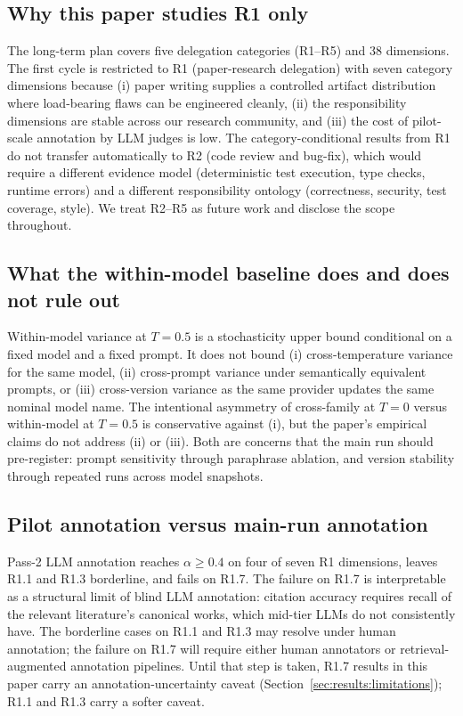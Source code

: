 \subsection{Why this paper studies R1 only}
\label{sec:discussion:r1_only}

The long-term plan covers five delegation categories (R1--R5) and 38 dimensions. The first cycle is restricted to R1 (paper-research delegation) with seven category dimensions because (i) paper writing supplies a controlled artifact distribution where load-bearing flaws can be engineered cleanly, (ii) the responsibility dimensions are stable across our research community, and (iii) the cost of pilot-scale annotation by LLM judges is low. The category-conditional results from R1 do not transfer automatically to R2 (code review and bug-fix), which would require a different evidence model (deterministic test execution, type checks, runtime errors) and a different responsibility ontology (correctness, security, test coverage, style). We treat R2--R5 as future work and disclose the scope throughout.

\subsection{What the within-model baseline does and does not rule out}
\label{sec:discussion:within_model}

Within-model variance at $T = 0.5$ is a stochasticity upper bound conditional on a fixed model and a fixed prompt. It does not bound (i) cross-temperature variance for the same model, (ii) cross-prompt variance under semantically equivalent prompts, or (iii) cross-version variance as the same provider updates the same nominal model name. The intentional asymmetry of cross-family at $T = 0$ versus within-model at $T = 0.5$ is conservative against (i), but the paper's empirical claims do not address (ii) or (iii). Both are concerns that the main run should pre-register: prompt sensitivity through paraphrase ablation, and version stability through repeated runs across model snapshots.

\subsection{Pilot annotation versus main-run annotation}
\label{sec:discussion:annotation}

Pass-2 LLM annotation reaches $\alpha \geq 0.4$ on four of seven R1 dimensions, leaves R1.1 and R1.3 borderline, and fails on R1.7. The failure on R1.7 is interpretable as a structural limit of blind LLM annotation: citation accuracy requires recall of the relevant literature's canonical works, which mid-tier LLMs do not consistently have. The borderline cases on R1.1 and R1.3 may resolve under human annotation; the failure on R1.7 will require either human annotators or retrieval-augmented annotation pipelines. Until that step is taken, R1.7 results in this paper carry an annotation-uncertainty caveat (Section~\ref{sec:results:limitations}); R1.1 and R1.3 carry a softer caveat.

